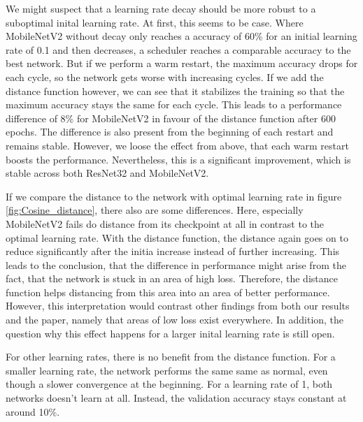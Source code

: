 We might suspect that a learning rate decay should be more robust to a
suboptimal inital learning rate. At first, this seems to be case. Where
MobileNetV2 without decay only reaches a accuracy of 60\% for an initial
learning rate of 0.1 and then decreases, a scheduler reaches a comparable
accuracy to the best network. But if we perform a warm restart, the maximum
accuracy drops for each cycle, so the network gets worse with increasing cycles.
If we add the distance function however, we can see that it stabilizes the
training so that the maximum accuracy stays the same for each cycle. This leads
to a performance difference of 8\% for MobileNetV2 in favour of the distance
function after 600 epochs. The difference is also present from the beginning of
each restart and remains stable. However, we loose the effect from above, that
each warm restart boosts the performance. Nevertheless, this is a significant
improvement, which is stable across both ResNet32 and MobileNetV2.

If we compare the distance to the network with optimal learning rate in figure
\ref{fig:Cosine_distance}, there also are some differences. Here, especially
MobileNetV2 fails do distance from its checkpoint at all in contrast to the
optimal learning rate. With the distance function, the distance again goes on to
reduce significantly after the initia increase instead of further increasing.
This leads to the conclusion, that the difference in performance might arise
from the fact, that the network is stuck in an area of high loss. Therefore, the
distance function helps distancing from this area into an area of better
performance. However, this interpretation would contrast other findings from
both our results and the paper, namely that areas of low loss exist everywhere.
In addition, the question why this effect happens for a larger inital learning
rate is still open.

For other learning rates, there is no benefit from the distance function. For a
smaller learning rate, the network performs the same same as normal, even though
a slower convergence at the beginning. For a learning rate of 1, both networks
doesn't learn at all. Instead, the validation accuracy stays constant at around
10\%.


